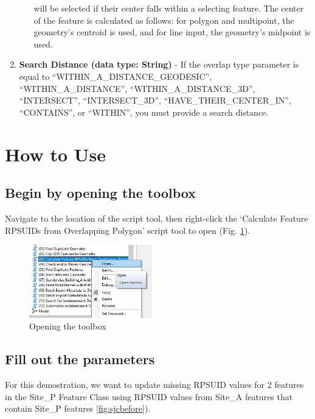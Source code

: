 \documentclass[openany]{book}
\theoremstyle{definition}
\theoremstyle{definition}
\theoremstyle{definition}
\theoremstyle{remark}
\begin{document}
\begin{enumerate}
\begin{itemize}
    will be selected if their center falls within a selecting feature.
    The center of the feature is calculated as follows: for polygon and
    multipoint, the geometry's centroid is used, and for line input, the
    geometry's midpoint is used.\\
  \end{itemize}
\item
  \textbf{Search Distance (data type: String)} - If the overlap type
  parameter is equal to ``WITHIN\_A\_DISTANCE\_GEODESIC'',
  ``WITHIN\_A\_DISTANCE'', ``WITHIN\_A\_DISTANCE\_3D'', ``INTERSECT'',
  ``INTERSECT\_3D'', ``HAVE\_THEIR\_CENTER\_IN'', ``CONTAINS'', or
  ``WITHIN'', you must provide a search distance.
\end{enumerate}

\section{How to Use}\label{how-to-use-2}

\subsection{Begin by opening the
toolbox}\label{begin-by-opening-the-toolbox-2}

Navigate to the location of the script tool, then right-click the
`Calculate Feature RPSUIDs from Overlapping Polygon' script tool to open
(Fig. \ref{fig:sjcopentool}).

\begin{figure}[H]

\hfill{}\includegraphics[width=2.1in,]{figures/spatjoinCalcopentool} 

\caption{Opening the toolbox}\label{fig:sjcopentool}
\end{figure}

\subsection{Fill out the parameters}\label{fill-out-the-parameters-2}

For this demostration, we want to update missing RPSUID values for 2
features in the Site\_P Feature Class using RPSUID values from Site\_A
features that contain Site\_P features \ref{fig:sjcbefore}).
\end{document}
